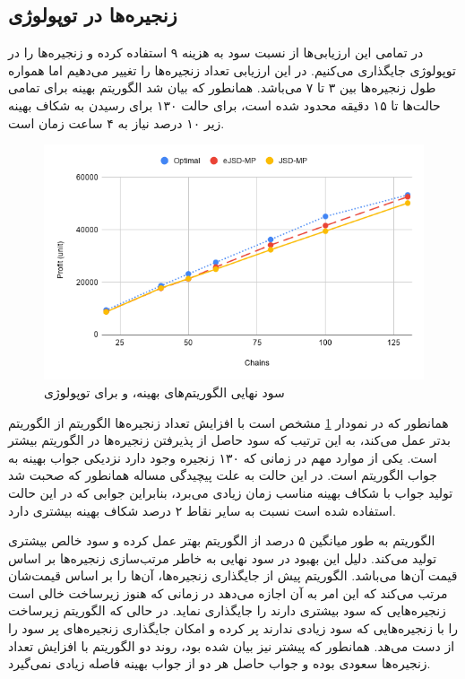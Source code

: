 \subsection{زنجیره‌ها در توپولوژی }

در تمامی این ارزیابی‌ها از نسبت سود به هزینه ۹ استفاده کرده و زنجیره‌ها را در توپولوژی  جایگذاری می‌کنیم.
در این ارزیابی تعداد زنجیره‌ها را تغییر می‌دهیم اما همواره طول زنجیره‌ها بین ۳ تا ۷ می‌باشد.
همانطور که بیان شد الگوریتم بهینه برای تمامی حالت‌ها تا ۱۵ دقیقه محدود شده است، برای حالت ۱۳۰ برای رسیدن به شکاف بهینه زیر ۱۰ درصد نیاز به ۴ ساعت زمان است.


\begin{figure}[h!]
\center\includegraphics[scale=.7]{images/chart-2}
\caption{سود نهایی الگوریتم‌های بهینه،  و  برای توپولوژی }
\label{fig.7}
\end{figure}

همانطور که در نمودار \ref{fig.7} مشخص است با افزایش تعداد زنجیره‌ها الگوریتم  از الگوریتم  بدتر عمل می‌کند،
به این ترتیب که سود حاصل از پذیرفتن زنجیره‌ها در الگوریتم  بیشتر است.
یکی از موارد مهم در زمانی که ۱۳۰ زنجیره وجود دارد نزدیکی جواب بهینه به جواب الگوریتم  است.
در این حالت به علت پیچیدگی مساله همانطور که صحبت شد تولید جواب با شکاف بهینه مناسب زمان زیادی می‌برد،
بنابراین جوابی که در این حالت استفاده شده است نسبت به سایر نقاط ۲ درصد شکاف بهینه بیشتری دارد.

الگوریتم  به طور میانگین ۵ درصد از الگوریتم 
بهتر عمل کرده و سود خالص بیشتری تولید می‌کند.
دلیل این بهبود در سود نهایی به خاطر مرتب‌سازی زنجیره‌ها بر اساس قیمت آن‌ها می‌باشد.
الگوریتم  پیش از جایگذاری زنجیره‌ها، آن‌ها را بر اساس قیمت‌شان مرتب می‌کند
که این امر به آن اجازه می‌دهد در زمانی که هنوز زیرساخت خالی است زنجیره‌هایی که سود بیشتری دارند را جایگذاری نماید.
در حالی که الگوریتم 
زیرساخت را با زنجیره‌هایی که سود زیادی ندارند پر کرده و امکان جایگذاری زنجیره‌های پر سود را از دست می‌هد.
همانطور که پیشتر نیز بیان شده بود، روند دو الگوریتم با افزایش تعداد زنجیره‌ها سعودی بوده و جواب حاصل هر دو از جواب بهینه فاصله
زیادی نمی‌گیرد.


